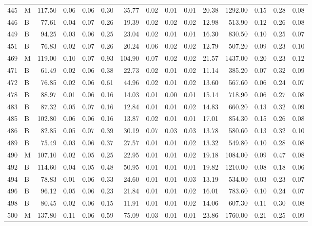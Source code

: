 \begin{table}[ht]
\begin{tabular}{rlrrrrrrrrrrrrr}
  445 & M & 117.50 & 0.06 & 0.06 & 0.30 & 35.77 & 0.02 & 0.01 & 0.01 & 20.38 & 1292.00 & 0.15 & 0.28 & 0.08 \\ 
  446 & B & 77.61 & 0.04 & 0.07 & 0.26 & 19.39 & 0.02 & 0.02 & 0.02 & 12.98 & 513.90 & 0.12 & 0.26 & 0.08 \\ 
  449 & B & 94.25 & 0.03 & 0.06 & 0.25 & 23.04 & 0.02 & 0.01 & 0.01 & 16.30 & 830.50 & 0.10 & 0.25 & 0.07 \\ 
  451 & B & 76.83 & 0.02 & 0.07 & 0.26 & 20.24 & 0.06 & 0.02 & 0.02 & 12.79 & 507.20 & 0.09 & 0.23 & 0.10 \\ 
  469 & M & 119.00 & 0.10 & 0.07 & 0.93 & 104.90 & 0.07 & 0.02 & 0.02 & 21.57 & 1437.00 & 0.20 & 0.23 & 0.12 \\ 
  471 & B & 61.49 & 0.02 & 0.06 & 0.38 & 22.73 & 0.02 & 0.01 & 0.02 & 11.14 & 385.20 & 0.07 & 0.32 & 0.09 \\ 
  472 & B & 76.85 & 0.02 & 0.06 & 0.61 & 44.96 & 0.02 & 0.01 & 0.02 & 13.60 & 567.60 & 0.06 & 0.24 & 0.07 \\ 
  478 & B & 88.97 & 0.01 & 0.06 & 0.16 & 14.03 & 0.01 & 0.00 & 0.01 & 15.14 & 718.90 & 0.06 & 0.27 & 0.08 \\ 
  483 & B & 87.32 & 0.05 & 0.07 & 0.16 & 12.84 & 0.01 & 0.01 & 0.02 & 14.83 & 660.20 & 0.13 & 0.32 & 0.09 \\ 
  485 & B & 102.80 & 0.06 & 0.06 & 0.16 & 13.87 & 0.02 & 0.01 & 0.01 & 17.01 & 854.30 & 0.15 & 0.26 & 0.08 \\ 
  486 & B & 82.85 & 0.05 & 0.07 & 0.39 & 30.19 & 0.07 & 0.03 & 0.03 & 13.78 & 580.60 & 0.13 & 0.32 & 0.10 \\ 
  489 & B & 75.49 & 0.03 & 0.06 & 0.37 & 27.57 & 0.01 & 0.01 & 0.02 & 13.32 & 549.80 & 0.10 & 0.28 & 0.08 \\ 
  490 & M & 107.10 & 0.02 & 0.05 & 0.25 & 22.95 & 0.01 & 0.01 & 0.02 & 19.18 & 1084.00 & 0.09 & 0.47 & 0.08 \\ 
  492 & B & 114.60 & 0.04 & 0.05 & 0.48 & 50.95 & 0.01 & 0.01 & 0.01 & 19.82 & 1210.00 & 0.08 & 0.18 & 0.06 \\ 
  494 & B & 78.83 & 0.01 & 0.06 & 0.33 & 24.60 & 0.01 & 0.01 & 0.03 & 13.19 & 534.00 & 0.03 & 0.23 & 0.07 \\ 
  496 & B & 96.12 & 0.05 & 0.06 & 0.23 & 21.84 & 0.01 & 0.01 & 0.02 & 16.01 & 783.60 & 0.10 & 0.24 & 0.07 \\ 
  498 & B & 80.45 & 0.02 & 0.06 & 0.15 & 11.91 & 0.01 & 0.01 & 0.02 & 14.06 & 607.30 & 0.11 & 0.30 & 0.08 \\ 
  500 & M & 137.80 & 0.11 & 0.06 & 0.59 & 75.09 & 0.03 & 0.01 & 0.01 & 23.86 & 1760.00 & 0.21 & 0.25 & 0.09 \\ 

\end{tabular}
\end{table}
